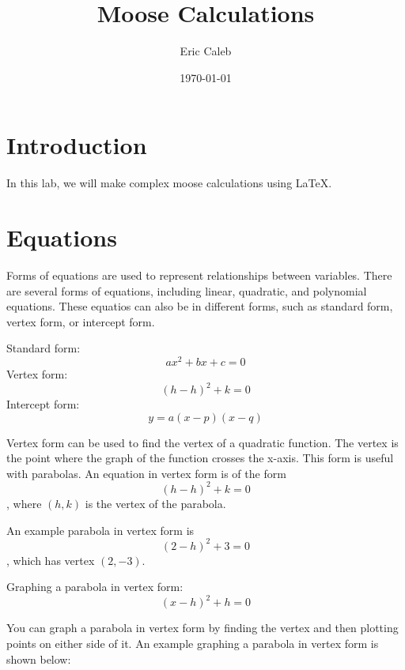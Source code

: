 \documentclass{article}
\author{Eric Caleb}
\date{\today}
\def\standardform#1#2#3{#1x^2 + #2x + #3 = 0}
\def\vertexform#1#2{(#1 - h)^2 + #2 = 0}
\def\interceptform#1#2#3{y = #1(x - #2)(x - #3)}
\begin{document}
\title{Moose Calculations}
\maketitle
\tableofcontents

\pagebreak
\section{Introduction}
In this lab, we will make complex moose calculations using LaTeX.

\section{Equations}

Forms of equations are used to represent relationships between variables. There are several forms of equations, including linear, quadratic, and polynomial equations.
These equatios can also be in different forms, such as standard form, vertex form, or intercept form.
\vspace{1cm}

Standard form: $$\standardform{a}{b}{c}$$
Vertex form: $$\vertexform{h}{k}$$
Intercept form: $$\interceptform{a}{p}{q}$$

Vertex form can be used to find the vertex of a quadratic function. The vertex is the point where the graph of the function crosses the x-axis.
This form is useful with parabolas. An equation in vertex form is of the form $$\vertexform{h}{k}$$, where $(h, k)$ is the vertex of the parabola.

An example parabola in vertex form is $$\vertexform{2}{3}$$, which has vertex $(2, -3)$.

Graphing a parabola in vertex form: $$\vertexform{x}{h}$$

You can graph a parabola in vertex form by finding the vertex and then plotting points on either side of it.
An example graphing a parabola in vertex form is shown below:

\begin{center}

\end{center}
\end{document}
